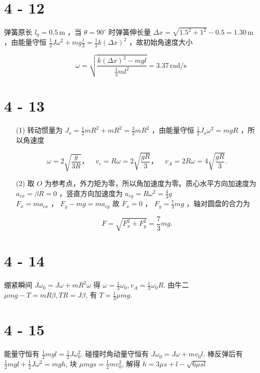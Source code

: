 \documentclass{article}
\begin{document}
\section*{4 - 12}

弹簧原长  $ l_0 = 0.5 \, \text{m} $ ，当  $ \theta = 90^\circ $  时弹簧伸长量  $ \Delta x = \sqrt{1.5^2 + 1^2} - 0.5 = 1.30 \, \text{m} $ ，由能量守恒  $ \frac{1}{2} J \omega^2 + mg \frac{l}{2} = \frac{1}{2} k (\Delta x)^2 $ ，故初始角速度大小

 $$
\omega = \sqrt{\frac{k (\Delta x)^2 - mgl}{\frac{1}{3} ml^2}} = 3.37 \, \text{rad/s} 
$$ 

\section*{4 - 13}

\begin{itemize}
    \item [(1)] 转动惯量为  $ J_o = \frac{1}{2} mR^2 + mR^2 = \frac{3}{2} mR^2 $ ，由能量守恒  $ \frac{1}{2} J_o \omega^2 = mgR $ ，所以角速度
    
 $$
    \omega = 2\sqrt{\frac{g}{3R}}，\quad v_c = R\omega = 2\sqrt{\frac{gR}{3}}，\quad v_A = 2R\omega = 4\sqrt{\frac{gR}{3}}.
    $$ 
    \item [(2)] 取  $ O $  为参考点，外力矩为零，所以角加速度为零。质心水平方向加速度为  $ a_{cx} = \beta R = 0 $ ，竖直方向加速度为  $ a_{cy} = R\omega^2 = \frac{4}{3}g $ \\  $ F_x = ma_{cx} $ ， $ F_y - mg = ma_{cy} $ 故  $ F_x = 0 $ ， $ F_y = \frac{7}{3}mg $ ，轴对圆盘的合力为
    
 $$
    F = \sqrt{F_x^2 + F_y^2} = \frac{7}{3}mg.
    $$ 
\end{itemize}

\section*{4 - 14}

绷紧瞬间 $J \omega_0 = J\omega + mR^2\omega$ 得 $\omega = \frac{1}{3}\omega_0, v_A = \frac{1}{3}\omega_0R$. 由牛二 $\mu mg - T = mR\beta, TR = J\beta$, 有 $T = \frac{1}{3}\mu mg$.

\section*{4 - 15}

能量守恒有 $\frac{1}{2}mgl = \frac{1}{2}J\omega_0^2$. 碰撞时角动量守恒有 $J\omega_0 = J\omega + mv_0l$. 棒反弹后有 $\frac{1}{2}mgl + \frac{1}{2}J\omega^2 = mgh$, 块 $\mu mg s = \frac{1}{2}mv^2_0$, 解得 $h = 3\mu s + l - \sqrt{6\mu sl}$\
\end{document}
